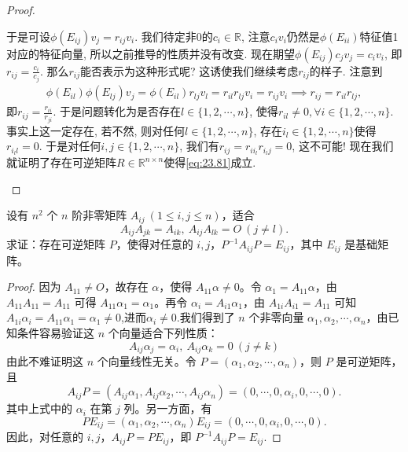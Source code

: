 \documentclass[../../main.tex]{subfiles}%
\begin{document}
\begin{proof}
\begin{enumerate}[(1)]
于是可设$\phi(E_{ij})v_j = r_{ij}v_i$. 我们待定非0的$c_i \in \mathbb{R}$, 注意$c_i v_i$仍然是$\phi(E_{ii})$特征值1对应的特征向量, 所以之前推导的性质并没有改变. 现在期望$\phi(E_{ij})c_j v_j = c_i v_i$, 即$r_{ij} = \frac{c_i}{c_j}$. 那么$r_{ij}$能否表示为这种形式呢? 这诱使我们继续考虑$r_{ij}$的样子.
注意到
\begin{align*}
\phi(E_{il})\phi(E_{lj})v_j = \phi(E_{il})r_{lj}v_l = r_{il}r_{lj}v_i = r_{ij}v_i \implies r_{ij} = r_{il}r_{lj},
\end{align*}
即$r_{ij} = \frac{r_{ii}}{r_{ji}}$. 于是问题转化为是否存在$l \in \{1,2,\cdots,n\}$, 使得$r_{il} \neq 0, \forall i \in \{1,2,\cdots,n\}$.
事实上这一定存在, 若不然, 则对任何$l \in \{1,2,\cdots,n\}$, 存在$i_l \in \{1,2,\cdots,n\}$使得$r_{i_l l} = 0$. 于是对任何$i,j \in \{1,2,\cdots,n\}$, 我们有$r_{ij} = r_{i i_l} r_{i_l j} = 0$, 这不可能! 现在我们就证明了存在可逆矩阵$R \in \mathbb{R}^{n \times n}$使得\eqref{eq:23.81}成立.
\end{enumerate}

\end{proof}

\begin{theorem}[基础矩阵的刻画]\label{theorem:非零相似于基础矩阵}
设有 $n^2$ 个 $n$ 阶非零矩阵 $A_{ij}\ (1 \leqslant  i,j \leqslant  n)$，适合
\[
A_{ij}A_{jk} = A_{ik},\ A_{ij}A_{lk} = O\ (j \neq l).
\]
求证：存在可逆矩阵 $P$，使得对任意的 $i,j$，$P^{-1}A_{ij}P = E_{ij}$，其中 $E_{ij}$ 是基础矩阵。
\end{theorem}
\begin{proof}

因为 $A_{11} \neq O$，故存在 $\alpha$，使得 $A_{11}\alpha \neq 0$。令 $\alpha_1 = A_{11}\alpha$，由 $A_{11}A_{11} = A_{11}$ 可得 $A_{11}\alpha_1 = \alpha_1$。再令 $\alpha_i = A_{i1}\alpha_1$，由 $A_{1i}A_{i1} = A_{11}$ 可知 $A_{1i}\alpha_i=A_{11}\alpha_1=\alpha_1 \neq 0$,进而$\alpha_i\neq 0$.我们得到了 $n$ 个非零向量 $\alpha_1,\alpha_2,\cdots,\alpha_n$，由已知条件容易验证这 $n$ 个向量适合下列性质：
\[A_{ij}\alpha_j = \alpha_i,\ A_{ij}\alpha_k = 0\ (j \neq k)\]
由此不难证明这 $n$ 个向量线性无关。令 $P = (\alpha_1,\alpha_2,\cdots,\alpha_n)$，则 $P$ 是可逆矩阵，且
\[
A_{ij}P = (A_{ij}\alpha_1,A_{ij}\alpha_2,\cdots,A_{ij}\alpha_n) = (0,\cdots,0,\alpha_i,0,\cdots,0).
\]
其中上式中的 $\alpha_i$ 在第 $j$ 列。另一方面，有
\[
PE_{ij} = (\alpha_1,\alpha_2,\cdots,\alpha_n)E_{ij} = (0,\cdots,0,\alpha_i,0,\cdots,0).
\]
因此，对任意的 $i,j$，$A_{ij}P = PE_{ij}$，即 $P^{-1}A_{ij}P = E_{ij}$.

\end{proof}
\end{document}
